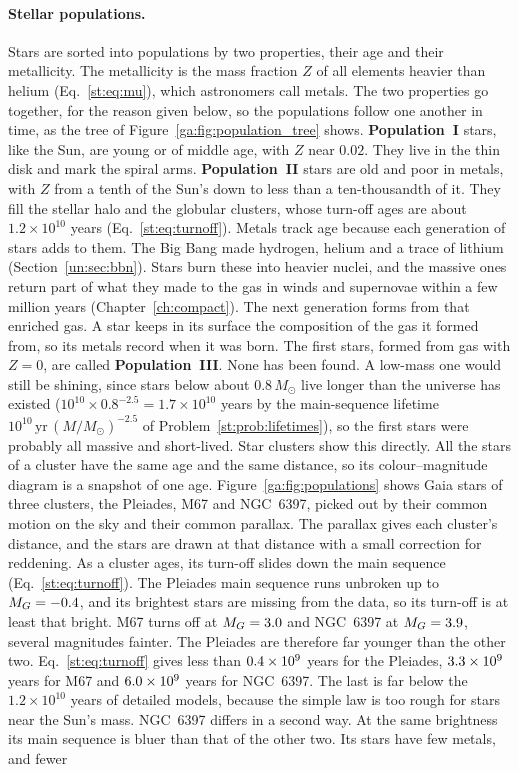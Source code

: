 \paragraph{Stellar populations.} Stars are sorted into populations by two properties, their age and their metallicity. The metallicity is the mass fraction $Z$ of all elements heavier than helium (Eq.~\eqref{st:eq:mu}), which astronomers call metals. The two properties go together, for the reason given below, so the populations follow one another in time, as the tree of Figure~\ref{ga:fig:population_tree} shows. \textbf{Population~I} stars, like the Sun, are young or of middle age, with $Z$ near $0.02$. They live in the thin disk and mark the spiral arms. \textbf{Population~II} stars are old and poor in metals, with $Z$ from a tenth of the Sun's down to less than a ten-thousandth of it. They fill the stellar halo and the globular clusters, whose turn-off ages are about $1.2\times10^{10}$ years (Eq.~\eqref{st:eq:turnoff}). Metals track age because each generation of stars adds to them. The Big Bang made hydrogen, helium and a trace of lithium (Section~\ref{un:sec:bbn}). Stars burn these into heavier nuclei, and the massive ones return part of what they made to the gas in winds and supernovae within a few million years (Chapter~\ref{ch:compact}). The next generation forms from that enriched gas. A star keeps in its surface the composition of the gas it formed from, so its metals record when it was born. The first stars, formed from gas with $Z=0$, are called \textbf{Population~III}. None has been found. A low-mass one would still be shining, since stars below about $0.8\,M_\odot$ live longer than the universe has existed ($10^{10}\times0.8^{-2.5}=1.7\times10^{10}$ years by the main-sequence lifetime $10^{10}\,\mathrm{yr}\,(M/M_\odot)^{-2.5}$ of Problem~\ref{st:prob:lifetimes}), so the first stars were probably all massive and short-lived. Star clusters show this directly. All the stars of a cluster have the same age and the same distance, so its colour--magnitude diagram is a snapshot of one age. Figure~\ref{ga:fig:populations} shows Gaia stars of three clusters, the Pleiades, M67 and NGC~6397, picked out by their common motion on the sky and their common parallax. The parallax gives each cluster's distance, and the stars are drawn at that distance with a small correction for reddening. As a cluster ages, its turn-off slides down the main sequence (Eq.~\eqref{st:eq:turnoff}). The Pleiades main sequence runs unbroken up to $M_G=-0.4$, and its brightest stars are missing from the data, so its turn-off is at least that bright. M67 turns off at $M_G=3.0$ and NGC~6397 at $M_G=3.9$, several magnitudes fainter. The Pleiades are therefore far younger than the other two. Eq.~\eqref{st:eq:turnoff} gives less than $0.4\times10^{9}$ years for the Pleiades, $3.3\times10^{9}$ years for M67 and $6.0\times10^{9}$ years for NGC~6397. The last is far below the $1.2\times10^{10}$ years of detailed models, because the simple law is too rough for stars near the Sun's mass. NGC~6397 differs in a second way. At the same brightness its main sequence is bluer than that of the other two. Its stars have few metals, and fewer 